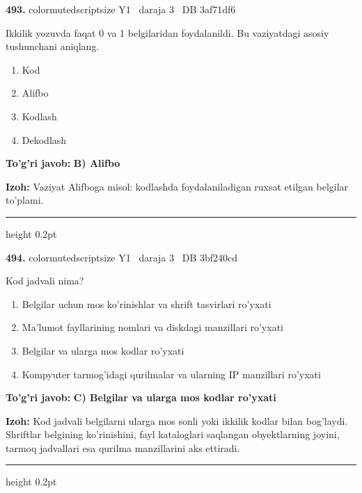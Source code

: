 \documentclass[10pt,a4paper,oneside]{article}
\begin{document}
\noindent\textbf{\color{ink}493.}  {color{muted}scriptsize Y1 \textbullet\ daraja 3 \textbullet\ DB 3af71df6}
\par
Ikkilik yozuvda faqat 0 va 1 belgilaridan foydalanildi. Bu vaziyatdagi asosiy tushunchani aniqlang.
\begin{enumerate}[label=\Alph*),leftmargin=9mm]
\item Kod
\item Alifbo
\item Kodlash
\item Dekodlash
\end{enumerate}
\begin{tcolorbox}[enhanced,breakable,colback=teal!4,colframe=teal!50!black,boxrule=0.5pt,arc=1.1mm,left=3mm,right=3mm,top=1.7mm,bottom=1.7mm,before skip=2mm,after skip=2mm]
\textbf{\color{teal}To'g'ri javob:} \textbf{B) Alifbo}
\par\smallskip
\textbf{Izoh:} Vaziyat Alifboga misol: kodlashda foydalaniladigan ruxsat etilgan belgilar to'plami.
\end{tcolorbox}
\vspace{2mm}\hrule height 0.2pt \vspace{3mm}

\noindent\textbf{\color{ink}494.}  {color{muted}scriptsize Y1 \textbullet\ daraja 3 \textbullet\ DB 3bf240cd}
\par
Kod jadvali nima?
\begin{enumerate}[label=\Alph*),leftmargin=9mm]
\item Belgilar uchun mos ko'rinishlar va shrift tasvirlari ro'yxati
\item Ma'lumot fayllarining nomlari va diskdagi manzillari ro'yxati
\item Belgilar va ularga mos kodlar ro'yxati
\item Kompyuter tarmog'idagi qurilmalar va ularning IP manzillari ro'yxati
\end{enumerate}
\begin{tcolorbox}[enhanced,breakable,colback=teal!4,colframe=teal!50!black,boxrule=0.5pt,arc=1.1mm,left=3mm,right=3mm,top=1.7mm,bottom=1.7mm,before skip=2mm,after skip=2mm]
\textbf{\color{teal}To'g'ri javob:} \textbf{C) Belgilar va ularga mos kodlar ro'yxati}
\par\smallskip
\textbf{Izoh:} Kod jadvali belgilarni ularga mos sonli yoki ikkilik kodlar bilan bog'laydi. Shriftlar belgining ko'rinishini, fayl kataloglari saqlangan obyektlarning joyini, tarmoq jadvallari esa qurilma manzillarini aks ettiradi.
\end{tcolorbox}
\vspace{2mm}\hrule height 0.2pt \vspace{3mm}
\end{document}

